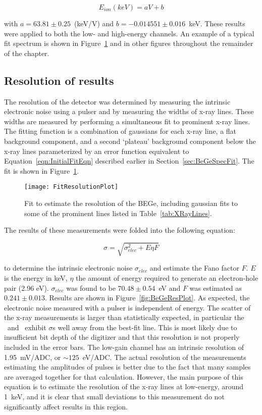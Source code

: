 			\[
			E_{ion} (keV) = a V + b
			\]  

with $a = 63.81\pm0.25$~(keV/V) and $b = -0.014551\pm0.016$~keV.  These results were applied to both the low- and high-energy channels.  An example of a typical fit spectrum is shown in Figure~\ref{fig:BeGeResFit} and in other figures throughout the remainder of the chapter.

		\subsection{Resolution of results}

The resolution of the detector was determined by measuring the intrinsic electronic noise using a pulser and by measuring the widths of x-ray lines.  These widths are measured by performing a simultaneous fit to prominent x-ray lines.  The fitting function is a combination of gaussians for each x-ray line, a flat background component, and a second `plateau' background component below the x-ray lines parameterized by an error function equivalent to Equation~\ref{eqn:InitialFitEqn} described earlier in Section~\ref{sec:BeGeSpecFit}.  The fit is shown in Figure~\ref{fig:BeGeResFit}.  
			\begin{figure}
				\centering
				\texttt{[image: FitResolutionPlot]}
				\caption[Estimate of BEGe resolution]
				{Fit to estimate the resolution of the BEGe, including gaussian fits to some of the prominent lines listed in Table~\ref{tab:XRayLines}.}
				\label{fig:BeGeResFit}
			\end{figure}
The results of these measurements were folded into the following equation:

			\begin{equation}
				\sigma = \sqrt{\sigma_{elec}^{2} + E \eta F}
				\label{eqn:SigmaEqn}
			\end{equation}

to determine the intrinsic electronic noise $\sigma_{elec}$ and estimate the Fano factor $F$.  $E$ is the energy in keV, $\eta$ the amount of energy required to generate an electron-hole pair (2.96 eV).  $\sigma_{elec}$ was found to be $70.48\pm0.54$~eV and $F$ was estimated as $0.241\pm0.013$.  Results are shown in Figure~\ref{fig:BeGeResPlot}.  As expected, the electronic noise measured with a pulser is independent of energy.  The scatter of the x-ray measurements is larger than statistically expected, in particular the \znsixfive~and \galsixeight~exhibit $\sigma$s well away from the best-fit line.  This is most likely due to insufficient bit depth of the digitizer and that this resolution is not properly included in the error bars.  The low-gain channel has an intrinsic resolution of 1.95~mV/ADC, or $\sim125$~eV/ADC.  The actual resolution of the measurements estimating the amplitudes of pulses is better due to the fact that many samples are averaged together for that calculation.  However, the main purpose of this equation is to estimate the resolution of the x-ray lines at low-energy, around 1~keV, and it is clear that small deviations to this measurement do not significantly affect results in this region.

